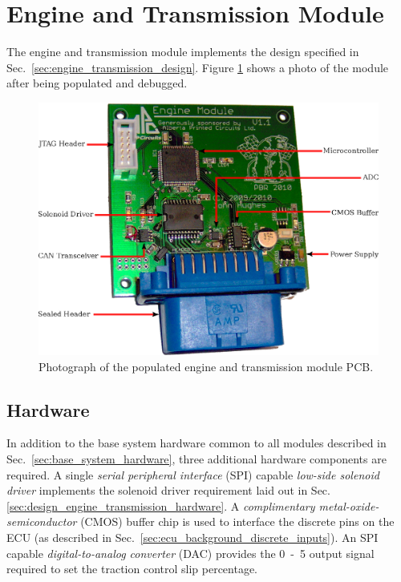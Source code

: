 \section{Engine and Transmission Module}

The engine and transmission module implements the design specified in Sec.\ \ref{sec:engine_transmission_design}. Figure \ref{fig:engine_transmission_pcb} shows a photo of the module after being populated and debugged.

\begin{figure}[H]
\centering
\includegraphics[scale=1]{implementation/figures/engine_transmission_pcb}
\caption{Photograph of the populated engine and transmission module PCB.}
\label{fig:engine_transmission_pcb}
\end{figure}

\subsection{Hardware}

In addition to the base system hardware common to all modules described in Sec.\ \ref{sec:base_system_hardware}, three additional hardware components are required. A single \emph{serial peripheral interface} (SPI) capable \emph{low-side solenoid driver} implements the solenoid driver requirement laid out in Sec. \ref{sec:design_engine_transmission_hardware}. A \emph{complimentary metal-oxide-semiconductor} (CMOS) buffer chip is used to interface the discrete pins on the ECU (as described in Sec.\ \ref{sec:ecu_background_discrete_inputs}). An SPI capable \emph{digital-to-analog converter} (DAC) provides the \unit{0-5}{\volt} output signal required to set the traction control slip percentage.

